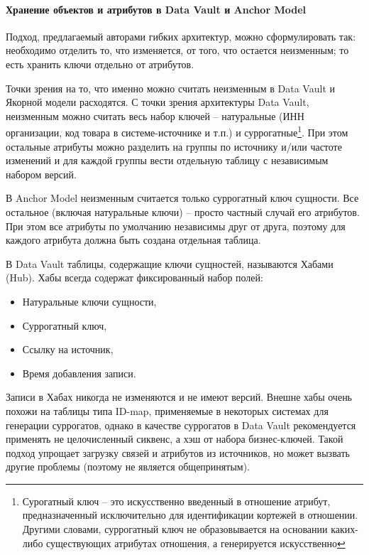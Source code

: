 \documentclass[%
	11pt,
	a4paper,
	utf8,
		]{article}
\begin{document}
\paragraph{Хранение объектов и атрибутов в Data Vault и Anchor Model} Подход, предлагаемый авторами гибких архитектур, можно сформулировать так: необходимо отделить то, что изменяется, от того, что остается неизменным; то есть хранить ключи отдельно от атрибутов.

Точки зрения на то, что именно можно считать неизменным в Data Vault и Якорной модели расходятся. С точки зрения архитектуры Data Vault, неизменным можно считать весь набор ключей -- натуральные (ИНН организации, код товара в системе-источнике и т.п.) и суррогатные\footnote{Сурогатный ключ -- это искусственно введенный в отношение атрибут, предназначенный исключительно для идентификации кортежей в отношении. Другими словами, суррогатный ключ не образовывается на основании каких-либо существующих атрибутах отношения, а генерируется искусственно}. При этом остальные атрибуты можно разделить на группы по источнику и/или частоте изменений и для каждой группы вести отдельную таблицу с независимым набором версий.

В Anchor Model неизменным считается только суррогатный ключ сущности. Все остальное (включая натуральные ключи) -- просто частный случай его атрибутов. При этом все атрибуты по умолчанию независимы друг от друга, поэтому для каждого атрибута должна быть создана отдельная таблица.

В Data Vault таблицы, содержащие ключи сущностей, называются Хабами (Hub). Хабы всегда содержат фиксированный набор полей:
\begin{itemize}
	\item Натуральные ключи сущности,
	
	\item Суррогатный ключ,
	
	\item Ссылку на источник,
	
	\item Время добавления записи.
\end{itemize}

Записи в Хабах никогда не изменяются и не имеют версий. Внешне хабы очень похожи на таблицы типа ID-map, применяемые в некоторых системах для генерации суррогатов, однако в качестве суррогатов в Data Vault рекомендуется применять не целочисленный сиквенс, а хэш от набора бизнес-ключей. Такой подход упрощает загрузку связей и атрибутов из источников, но может вызвать другие проблемы (поэтому не является общепринятым).
\end{document}
